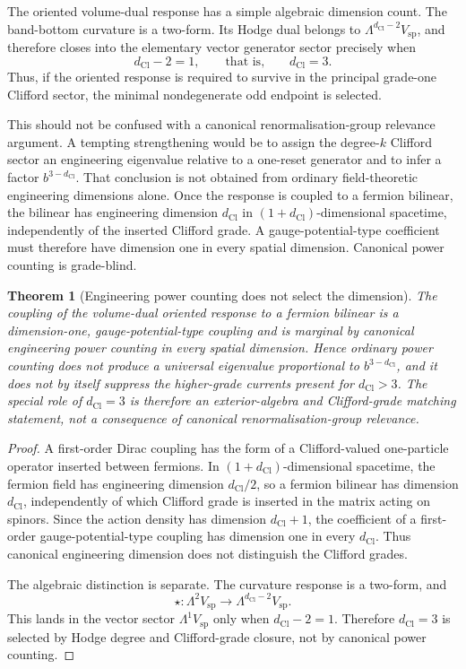 \documentclass[11pt]{article}
\newtheorem{theorem}{Theorem}[section]
\theoremstyle{definition}
\theoremstyle{remark}
\newcommand{\dCl}{d_{\mathrm{Cl}}}
\newcommand{\Vsp}{V_{\mathrm{sp}}}
\begin{document}
The oriented volume-dual response has a simple algebraic dimension count.  The
band-bottom curvature is a two-form.  Its Hodge dual belongs to
\(\Lambda^{\dCl-2}\Vsp\), and therefore closes into the elementary vector
generator sector precisely when
\[
  \dCl-2=1,
  \qquad\text{that is,}\qquad \dCl=3.
\]
Thus, if the oriented response is required to survive in the principal
grade-one Clifford sector, the minimal nondegenerate odd endpoint is selected.

This should not be confused with a canonical renormalisation-group relevance
argument.  A tempting strengthening would be to assign the degree-\(k\)
Clifford sector an engineering eigenvalue relative to a one-reset generator and
to infer a factor \(b^{3-\dCl}\).  That conclusion is not obtained from ordinary
field-theoretic engineering dimensions alone.  Once the response is coupled to
a fermion bilinear, the bilinear has engineering dimension \(\dCl\) in
\((1+\dCl)\)-dimensional spacetime, independently of the inserted Clifford
grade.  A gauge-potential-type coefficient must therefore have dimension one in
every spatial dimension.  Canonical power counting is grade-blind.

\begin{theorem}[Engineering power counting does not select the dimension]
\label{thm:rg-no-dimension-selection}
The coupling of the volume-dual oriented response to a fermion bilinear is a
dimension-one, gauge-potential-type coupling and is marginal by canonical
engineering power counting in every spatial dimension.  Hence ordinary power
counting does not produce a universal eigenvalue proportional to
\(b^{3-\dCl}\), and it does not by itself suppress the higher-grade currents
present for \(\dCl>3\).  The special role of \(\dCl=3\) is therefore an
exterior-algebra and Clifford-grade matching statement, not a consequence of
canonical renormalisation-group relevance.
\end{theorem}

\begin{proof}
A first-order Dirac coupling has the form of a Clifford-valued one-particle
operator inserted between fermions.  In \((1+\dCl)\)-dimensional spacetime, the
fermion field has engineering dimension \(\dCl/2\), so a fermion bilinear has
dimension \(\dCl\), independently of which Clifford grade is inserted in the
matrix acting on spinors.  Since the action density has dimension
\(\dCl+1\), the coefficient of a first-order gauge-potential-type coupling has
dimension one in every \(\dCl\).  Thus canonical engineering dimension does not
distinguish the Clifford grades.

The algebraic distinction is separate.  The curvature response is a two-form,
and
\[
  \star:\Lambda^2\Vsp\longrightarrow \Lambda^{\dCl-2}\Vsp .
\]
This lands in the vector sector \(\Lambda^1\Vsp\) only when \(\dCl-2=1\).
Therefore \(\dCl=3\) is selected by Hodge degree and Clifford-grade closure,
not by canonical power counting.
\end{proof}
\end{document}
